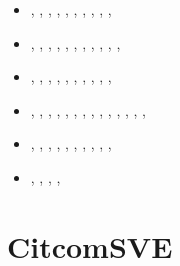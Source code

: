 \begin{small}
\begin{itemize}
\item[\twothousandtwenty]    \textcite{weki20},  \textcite{braf20},  \textcite{pagh20},
                             \textcite{vamg20},  \textcite{heyg20},  \textcite{loru20}, 
                             \textcite{bill20},  \textcite{sele20},
                             \textcite{dazl20},  \textcite{wali20}, 
\item[\twothousandtwentyone] \textcite{cafm21},  \textcite{ligl21},  \textcite{lule21},
                             \textcite{scvg21},  \textcite{ligl21b}, \textcite{maba21},
                             \textcite{wali21},  \textcite{cafb21},  \textcite{mazh21a}
                             \textcite{hulg21},  \textcite{moma21},  \textcite{sabp21},
                             \textcite{mazh21b}
\item[\twothousandtwentytwo] \textcite{limc22},  \textcite{scva22},  \textcite{yuli22},
                             \textcite{flbw22},  \textcite{kibm22},  \textcite{rojy22},
                             \textcite{ghpa22},  \textcite{maba22},  \textcite{peli22},
                             \textcite{fube22},  \textcite{wuwh22}
\item[\twothousandtwentythree] \textcite{li__23}, \textcite{lilz23}, \textcite{bofl23},
                               \textcite{hagl23}, \textcite{wacp23}, \textcite{lilw23},
                               \textcite{zhzl23}, \textcite{li__23}, \textcite{befu23},
                               \textcite{pacb23}, \textcite{tumk23}, \textcite{zhle23},
                               \textcite{peli23}, \textcite{pagh23}, \textcite{yuld23}
\item[\twothousandtwentyfour]  \textcite{bero24}, \textcite{lobb24}, \textcite{muki24},
                               \textcite{wefl24}, \textcite{sawb24}, \textcite{docl24},
                               \textcite{lizm24}, \textcite{pest24}, \textcite{haym24},
                               \textcite{xihw24}, \textcite{liwg24}
\item[\twothousandtwentyfive]  \textcite{bhjk25}, \textcite{weki25}, \textcite{yawz25},
                               \textcite{hugu25}, \textcite{cufa25}
\end{itemize}
\end{small}


\section{CitcomSVE} 

